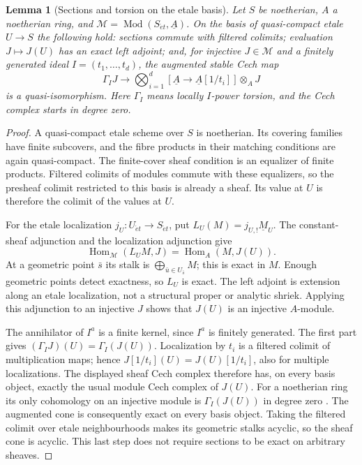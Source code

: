 \documentclass[11pt]{article}
\newtheorem{lemma}[theorem]{Lemma}
\theoremstyle{definition}
\theoremstyle{remark}
\begin{document}
\begin{lemma}[Sections and torsion on the etale basis]
\label{lem:frag-etale-sections-torsion}
Let $S$ be noetherian, $A$ a noetherian ring, and
$\mathcal M=\operatorname{Mod}(S_{\acute et},\underline A)$.
On the basis of quasi-compact etale $U\to S$ the following hold:
sections commute with filtered colimits; evaluation $J\mapsto J(U)$
has an exact left adjoint; and, for injective $J\in\mathcal M$ and a
finitely generated ideal $I=(t_1,\ldots,t_d)$, the augmented stable
Cech map
\[
 \Gamma_IJ\longrightarrow
 \bigotimes_{i=1}^d[\underline A\to\underline A[1/t_i]]\otimes_AJ
\]
is a quasi-isomorphism.  Here $\Gamma_I$ means locally $I$-power
torsion, and the Cech complex starts in degree zero.
\end{lemma}
\begin{proof}
A quasi-compact etale scheme over $S$ is noetherian.  Its covering
families have finite subcovers, and the fibre products in their
matching conditions are again quasi-compact.  The finite-cover
sheaf condition is an equalizer of finite products.  Filtered
colimits of modules commute with these equalizers, so the presheaf
colimit restricted to this basis is already a sheaf.  Its value
at $U$ is therefore the colimit of the values at $U$.

For the etale localization $j_U:U_{\acute et}\to S_{\acute et}$,
put $L_U(M)=j_{U,!}\underline M_U$.  The constant-sheaf adjunction
and the localization adjunction give
\[
 \operatorname{Hom}_{\mathcal M}(L_U M,J)
       =\operatorname{Hom}_A(M,J(U)).
\]
At a geometric point $\bar s$ its stalk is
$\bigoplus_{\bar u\in U_{\bar s}}M$; this is exact in $M$.
Enough geometric points detect exactness, so $L_U$ is exact.
The left adjoint is extension along an etale localization, not a
structural proper or analytic shriek.  Applying this adjunction to
an injective $J$ shows that $J(U)$ is an injective $A$-module.

The annihilator of $I^a$ is a finite kernel, since $I^a$ is finitely
generated.  The first part gives
$(\Gamma_IJ)(U)=\Gamma_I(J(U))$.
Localization by $t_i$ is a filtered colimit of multiplication maps;
hence $J[1/t_i](U)=J(U)[1/t_i]$, also for multiple localizations.
The displayed sheaf Cech complex therefore has, on every basis
object, exactly the usual module Cech complex of $J(U)$.
For a noetherian ring its only cohomology on an injective module is
$\Gamma_I(J(U))$ in degree zero
\cite[Lemma 47.10.1]{StacksNoetherianTorsion}.
The augmented cone is consequently exact on every basis object.
Taking the filtered colimit over etale neighbourhoods makes its
geometric stalks acyclic, so the sheaf cone is acyclic.  This last
step does not require sections to be exact on arbitrary sheaves.
\end{proof}
\end{document}
